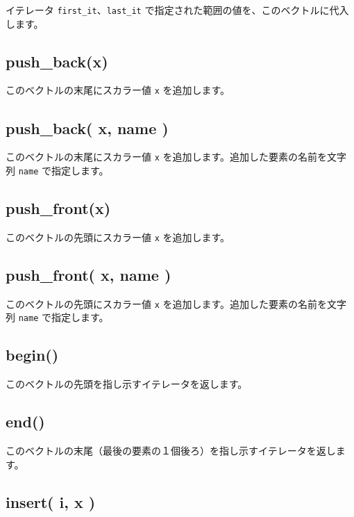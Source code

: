 \documentclass[]{book}
\begin{document}
イテレータ \texttt{first\_it}、\texttt{last\_it} で指定された範囲の値を、このベクトルに代入します。

\hypertarget{push_backx}{%
\subsection{push\_back(x)}\label{push_backx}}

このベクトルの末尾にスカラー値 \texttt{x} を追加します。

\hypertarget{push_back-x-name}{%
\subsection{push\_back( x, name )}\label{push_back-x-name}}

このベクトルの末尾にスカラー値 \texttt{x} を追加します。追加した要素の名前を文字列 \texttt{name} で指定します。

\hypertarget{push_frontx}{%
\subsection{push\_front(x)}\label{push_frontx}}

このベクトルの先頭にスカラー値 \texttt{x} を追加します。

\hypertarget{push_front-x-name}{%
\subsection{push\_front( x, name )}\label{push_front-x-name}}

このベクトルの先頭にスカラー値 \texttt{x} を追加します。追加した要素の名前を文字列 \texttt{name} で指定します。

\hypertarget{begin}{%
\subsection{begin()}\label{begin}}

このベクトルの先頭を指し示すイテレータを返します。

\hypertarget{end}{%
\subsection{end()}\label{end}}

このベクトルの末尾（最後の要素の１個後ろ）を指し示すイテレータを返します。

\hypertarget{insert-i-x}{%
\subsection{insert( i, x )}\label{insert-i-x}}
\end{document}
